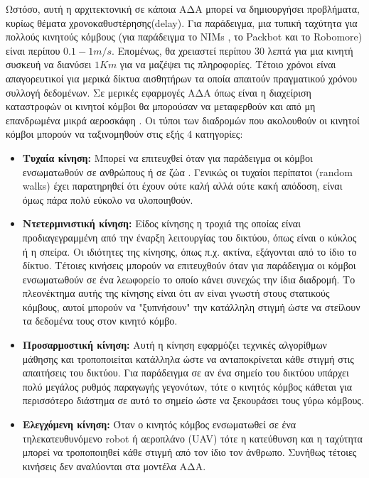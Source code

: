 Ωστόσο, αυτή η αρχιτεκτονική σε κάποια ΑΔΑ μπορεί να δημιουργήσει προβλήματα, κυρίως θέματα χρονοκαθυστέρησης(delay). Για παράδειγμα, μια τυπική ταχύτητα για πολλούς
κινητούς κόμβους (για παράδειγμα το NIMs \cite{nims_mobile}, το Packbot \cite{dynamic_deadlines} και το Robomore\cite{robomore_mobile}) είναι περίπου $0.1-1m/s$.
Επομένως, θα χρειαστεί περίπου 30 λεπτά για μια κινητή συσκευή να διανύσει $1Km$ για να μαζέψει τις πληροφορίες. Τέτοιο χρόνοι είναι απαγορευτικοί για μερικά δίκτυα
αισθητήρων τα οποία απαιτούν πραγματικού χρόνου συλλογή δεδομένων. Σε μερικές εφαρμογές ΑΔΑ όπως είναι η διαχείριση καταστροφών οι κινητοί κόμβοι θα μπορούσαν να
μεταφερθούν και από μη επανδρωμένα μικρά αεροσκάφη \cite{uav_mobile}. Οι τύποι των διαδρομών που ακολουθούν οι κινητοί κόμβοι μπορούν να ταξινομηθούν στις εξής 4
κατηγορίες:

\begin{itemize}
\item \textbf{Τυχαία κίνηση:} Μπορεί να επιτευχθεί όταν για παράδειγμα οι κόμβοι ενσωματωθούν σε ανθρώπους ή σε ζώα \cite{zebranet}. Γενικώς οι τυχαίοι περίπατοι
(random walks) έχει παρατηρηθεί ότι έχουν ούτε καλή αλλά ούτε κακή απόδοση, είναι όμως πάρα πολύ εύκολο να υλοποιηθούν.

\item \textbf{Ντετερμινιστική κίνηση:} Είδος κίνησης η τροχιά της οποίας είναι προδιαγεγραμμένη από την έναρξη λειτουργίας του δικτύου, όπως είναι ο κύκλος ή η
σπείρα. Οι ιδιότητες της κίνησης, όπως π.χ. ακτίνα, εξάγονται από το ίδιο το δίκτυο. Τέτοιες κινήσεις μπορούν να επιτευχθούν όταν για παράδειγμα οι κόμβοι
ενσωματωθούν σε ένα λεωφορείο το οποίο κάνει συνεχώς την ίδια διαδρομή. Το πλεονέκτημα αυτής της κίνησης είναι ότι αν είναι γνωστή στους στατικούς κόμβους, αυτοί
μπορούν να "ξυπνήσουν" την κατάλληλη στιγμή ώστε να στείλουν τα δεδομένα τους στον κινητό κόμβο.

\item \textbf{Προσαρμοστική κίνηση:} Αυτή η κίνηση εφαρμόζει τεχνικές αλγορίθμων μάθησης και τροποποιείται κατάλληλα ώστε να ανταποκρίνεται κάθε στιγμή στις
απαιτήσεις του δικτύου. Για παράδειγμα σε αν ένα σημείο του δικτύου υπάρχει πολύ μεγάλος ρυθμός παραγωγής γεγονότων, τότε ο κινητός κόμβος κάθεται για περισσότερο
διάστημα σε αυτό το σημείο ώστε να ξεκουράσει τους γύρω κόμβους.

\item \textbf{Ελεγχόμενη κίνηση:} Όταν ο κινητός κόμβος ενσωματωθεί σε ένα τηλεκατευθυνόμενο robot ή αεροπλάνο (UAV) τότε η κατεύθυνση και η ταχύτητα μπορεί να
τροποποιηθεί κάθε στιγμή από τον ίδιο τον άνθρωπο. Συνήθως τέτοιες κινήσεις δεν αναλύονται στα μοντέλα ΑΔΑ.
\end{itemize}



